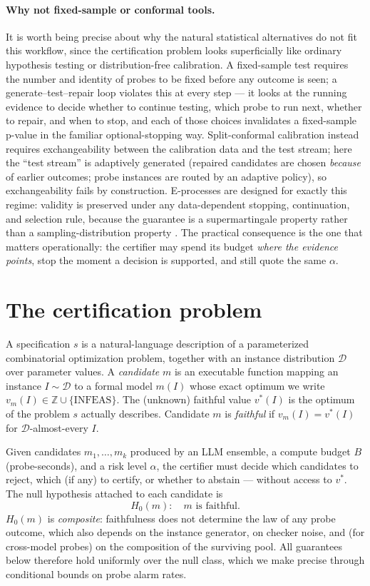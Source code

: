 \documentclass[pdflatex,sn-mathphys-num]{sn-jnl}
\theoremstyle{thmstyleone}
\theoremstyle{thmstyletwo}
\newcommand{\HO}{H_0}
\begin{document}
\paragraph{Why not fixed-sample or conformal tools.}
It is worth being precise about why the natural statistical
alternatives do not fit this workflow, since the certification
problem looks superficially like ordinary hypothesis testing or
distribution-free calibration. A fixed-sample test requires the
number and identity of probes to be fixed before any outcome is seen;
a generate--test--repair loop violates this at every step --- it
looks at the running evidence to decide whether to continue testing,
which probe to run next, whether to repair, and when to stop, and
each of those choices invalidates a fixed-sample p-value in the
familiar optional-stopping way. Split-conformal calibration instead
requires exchangeability between the calibration data and the test
stream; here the ``test stream'' is adaptively generated (repaired
candidates are chosen \emph{because} of earlier outcomes; probe
instances are routed by an adaptive policy), so exchangeability fails
by construction. E-processes are designed for exactly this
regime: validity is preserved under any data-dependent stopping,
continuation, and selection rule, because the guarantee is a
supermartingale property rather than a sampling-distribution
property \cite{ramdas2023game}. The practical consequence is the one
that matters operationally: the certifier may spend its budget
\emph{where the evidence points}, stop the moment a decision is
supported, and still quote the same $\alpha$.

\section{The certification problem}\label{sec:problem}

A specification $s$ is a natural-language description of a
parameterized combinatorial optimization problem, together with an
instance distribution $\mathcal{D}$ over parameter values. A
\emph{candidate} $m$ is an executable function mapping an instance
$I \sim \mathcal{D}$ to a formal model $m(I)$ whose exact optimum we
write $v_m(I) \in \mathbb{Z} \cup \{\mathrm{INFEAS}\}$. The (unknown)
faithful value $v^\ast(I)$ is the optimum of the problem $s$ actually
describes. Candidate $m$ is \emph{faithful} if
$v_m(I) = v^\ast(I)$ for $\mathcal{D}$-almost-every $I$.

Given candidates $m_1, \dots, m_k$ produced by an LLM ensemble, a
compute budget $B$ (probe-seconds), and a risk level $\alpha$, the
certifier must decide which candidates to reject, which (if any) to
certify, or whether to abstain --- without access to $v^\ast$. The
null hypothesis attached to each candidate is
\[
\HO(m):\quad m \text{ is faithful.}
\]
$\HO(m)$ is \emph{composite}: faithfulness does not determine the law
of any probe outcome, which also depends on the instance generator,
on checker noise, and (for cross-model probes) on the composition of
the surviving pool. All guarantees below therefore hold uniformly
over the null class, which we make precise through conditional
bounds on probe alarm rates.
\end{document}
